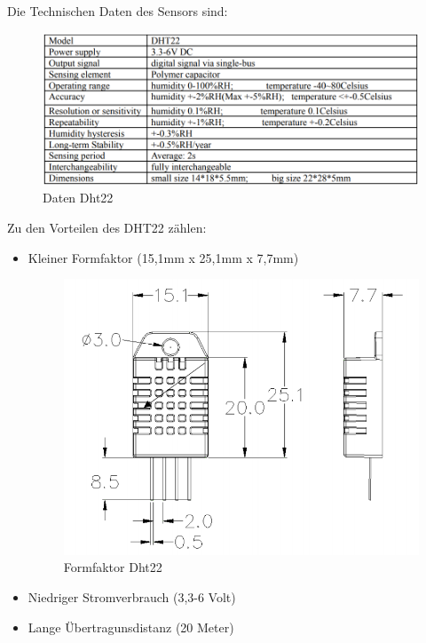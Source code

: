 Die Technischen Daten des Sensors sind:
\begin{figure}[H]
    \begin{center}
        \includegraphics[scale=0.6]{images/dht22_datasheet.png}
        \caption{Daten Dht22 \cite{dht22_datasheet_sparkfun}}
    \end{center}
\end{figure}

Zu den Vorteilen des DHT22 zählen:
\begin{itemize}
    \item Kleiner Formfaktor (15,1mm x 25,1mm x 7,7mm)
    \begin{figure}[H]
        \begin{center}
            \includegraphics[scale=0.6]{images/dht22_formfaktor.png}
            \caption{Formfaktor Dht22 \cite{dht22_datasheet_sparkfun}}
        \end{center}
    \end{figure}
    \item Niedriger Stromverbrauch (3,3-6 Volt)
    \item Lange Übertragunsdistanz (20 Meter)
\end{itemize}

